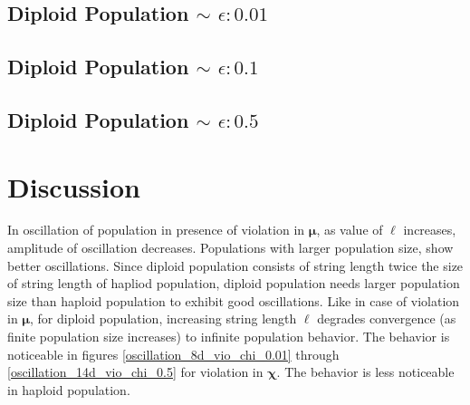 \subsection{Diploid Population $\mathtt{\sim}$ $\epsilon: 0.01$}

\subsection{Diploid Population $\mathtt{\sim}$ $\epsilon: 0.1$}

\subsection{Diploid Population $\mathtt{\sim}$ $\epsilon: 0.5$}


\section{Discussion}
In oscillation of population in presence of violation in $\bm{\mu}$, 
as value of $\ell$ increases, amplitude of oscillation decreases. 
Populations with larger population size, show better oscillations. 
Since diploid population consists of string length twice the size of string length of hapliod population, 
diploid population needs larger population size than haploid population to exhibit good oscillations. 
Like in case of violation in $\bm{\mu}$, for diploid population, increasing string length $\ell$ 
degrades convergence (as finite population size increases) to infinite population behavior. 
The behavior is noticeable in figures 
\ref{oscillation_8d_vio_chi_0.01} through \ref{oscillation_14d_vio_chi_0.5} for violation in $\bm{\chi}$. 
The behavior is less noticeable in haploid population.

